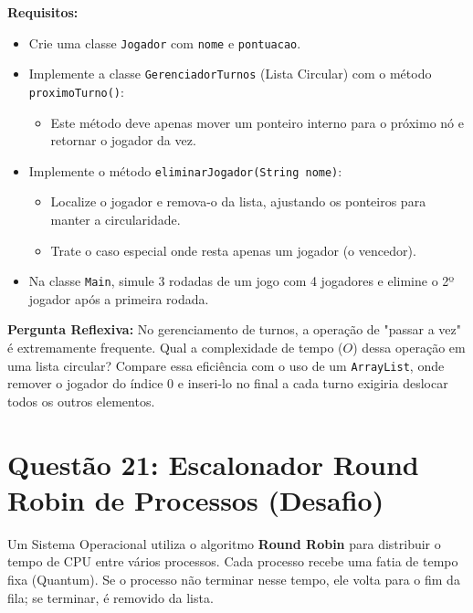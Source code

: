 \documentclass[12pt, a4paper]{article}
\begin{document}
\textbf{Requisitos:}
\begin{itemize}
    \item Crie uma classe \texttt{Jogador} com \texttt{nome} e \texttt{pontuacao}.
    \item Implemente a classe \texttt{GerenciadorTurnos} (Lista Circular) com o método \texttt{proximoTurno()}:
    \begin{itemize}
        \item Este método deve apenas mover um ponteiro interno para o próximo nó e retornar o jogador da vez.
    \end{itemize}
    \item Implemente o método \texttt{eliminarJogador(String nome)}:
    \begin{itemize}
        \item Localize o jogador e remova-o da lista, ajustando os ponteiros para manter a circularidade.
        \item Trate o caso especial onde resta apenas um jogador (o vencedor).
    \end{itemize}
    \item Na classe \texttt{Main}, simule 3 rodadas de um jogo com 4 jogadores e elimine o 2º jogador após a primeira rodada.
\end{itemize}

\textbf{Pergunta Reflexiva:} No gerenciamento de turnos, a operação de "passar a vez" é extremamente frequente. Qual a complexidade de tempo ($O$) dessa operação em uma lista circular? Compare essa eficiência com o uso de um \texttt{ArrayList}, onde remover o jogador do índice 0 e inseri-lo no final a cada turno exigiria deslocar todos os outros elementos.

\vspace{0.2cm}

\section*{Questão 21: Escalonador Round Robin de Processos (Desafio)}
Um Sistema Operacional utiliza o algoritmo \textbf{Round Robin} para distribuir o tempo de CPU entre vários processos. Cada processo recebe uma fatia de tempo fixa (Quantum). Se o processo não terminar nesse tempo, ele volta para o fim da fila; se terminar, é removido da lista.
\end{document}
